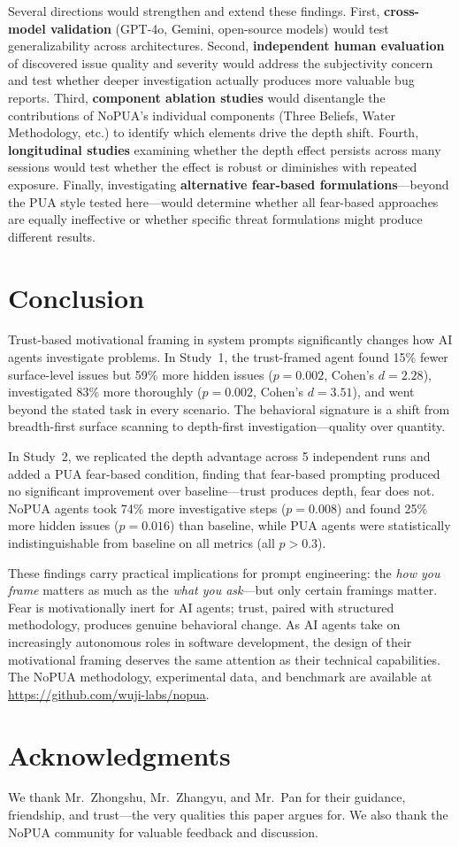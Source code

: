 \documentclass[11pt]{article}
\begin{document}
Several directions would strengthen and extend these findings. First, \textbf{cross-model validation} (GPT-4o, Gemini, open-source models) would test generalizability across architectures. Second, \textbf{independent human evaluation} of discovered issue quality and severity would address the subjectivity concern and test whether deeper investigation actually produces more valuable bug reports. Third, \textbf{component ablation studies} would disentangle the contributions of NoPUA's individual components (Three Beliefs, Water Methodology, etc.) to identify which elements drive the depth shift. Fourth, \textbf{longitudinal studies} examining whether the depth effect persists across many sessions would test whether the effect is robust or diminishes with repeated exposure. Finally, investigating \textbf{alternative fear-based formulations}---beyond the PUA style tested here---would determine whether all fear-based approaches are equally ineffective or whether specific threat formulations might produce different results.

\section{Conclusion}

Trust-based motivational framing in system prompts significantly changes how AI agents investigate problems. In Study~1, the trust-framed agent found 15\% fewer surface-level issues but 59\% more hidden issues ($p = 0.002$, Cohen's $d = 2.28$), investigated 83\% more thoroughly ($p = 0.002$, Cohen's $d = 3.51$), and went beyond the stated task in every scenario. The behavioral signature is a shift from breadth-first surface scanning to depth-first investigation---quality over quantity.

In Study~2, we replicated the depth advantage across 5 independent runs and added a PUA fear-based condition, finding that fear-based prompting produced no significant improvement over baseline---trust produces depth, fear does not. NoPUA agents took 74\% more investigative steps ($p = 0.008$) and found 25\% more hidden issues ($p = 0.016$) than baseline, while PUA agents were statistically indistinguishable from baseline on all metrics (all $p > 0.3$).

These findings carry practical implications for prompt engineering: the \emph{how you frame} matters as much as the \emph{what you ask}---but only certain framings matter. Fear is motivationally inert for AI agents; trust, paired with structured methodology, produces genuine behavioral change. As AI agents take on increasingly autonomous roles in software development, the design of their motivational framing deserves the same attention as their technical capabilities. The NoPUA methodology, experimental data, and benchmark are available at \url{https://github.com/wuji-labs/nopua}.

\section*{Acknowledgments}

We thank Mr.\ Zhongshu, Mr.\ Zhangyu, and Mr.\ Pan for their guidance, friendship, and trust---the very qualities this paper argues for. We also thank the NoPUA community for valuable feedback and discussion.



\end{document}
